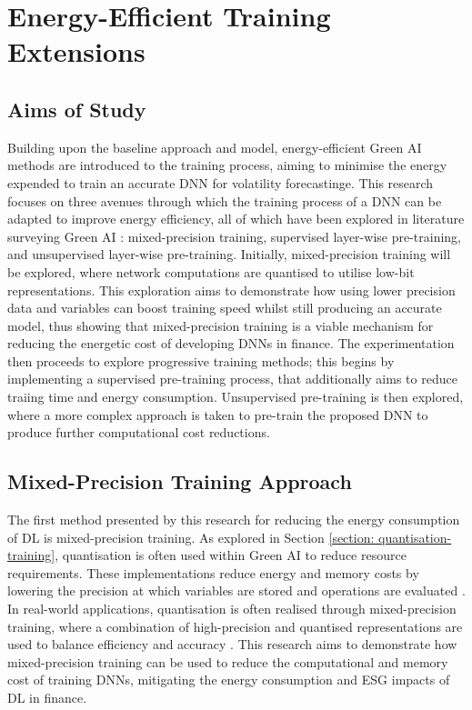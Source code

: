 \documentclass[a4paper, 11pt]{report}
\begin{document}
    \section{Energy-Efficient Training Extensions}
    \label{section: energy-extensions}

    \subsection{Aims of Study}

    Building upon the baseline approach and model, energy-efficient Green AI methods are introduced to the training process, aiming to minimise the energy expended to train an accurate DNN for volatility forecastinge. This research focuses on three avenues through which the training process of a DNN can be adapted to improve energy efficiency, all of which have been explored in literature surveying Green AI \citep{xu-2021}: mixed-precision training, supervised layer-wise pre-training, and unsupervised layer-wise pre-training. Initially, mixed-precision training will be explored, where network computations are quantised to utilise low-bit representations. This exploration aims to demonstrate how using lower precision data and variables can boost training speed whilst still producing an accurate model, thus showing that mixed-precision training is a viable mechanism for reducing the energetic cost of developing DNNs in finance. The experimentation then proceeds to explore progressive training methods; this begins by implementing a supervised pre-training process, that additionally aims to reduce traiing time and energy consumption. Unsupervised pre-training is then explored, where a more complex approach is taken to pre-train the proposed DNN to produce further computational cost reductions.


    \subsection{Mixed-Precision Training Approach}
    \label{section: mixed-precision-method}

    The first method presented by this research for reducing the energy consumption of DL is mixed-precision training. As explored in Section \ref{section: quantisation-training}, quantisation is often used within Green AI to reduce resource requirements. These implementations reduce energy and memory costs by lowering the precision at which variables are stored and operations are evaluated \citep{fan-2020b}. In real-world applications, quantisation is often realised through mixed-precision training, where a combination of high-precision and quantised representations are used to balance efficiency and accuracy \citep{ott-2017}. This research aims to demonstrate how mixed-precision training can be used to reduce the computational and memory cost of training DNNs, mitigating the energy consumption and ESG impacts of DL in finance.
\end{document}
